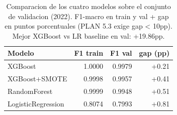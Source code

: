 \begin{table}[ht]
\centering
\small
\caption{Comparacion de los cuatro modelos sobre el conjunto de validacion (2022).
F1-macro en train y val + gap en puntos porcentuales (PLAN 5.3 exige gap < 10pp).
Mejor XGBoost vs LR baseline en val: +19.86pp.}
\label{tab:comparacion_modelos_validation}
\begin{tabular}{l rrr}
\toprule
Modelo & F1 train & F1 val & gap (pp) \\
\midrule
XGBoost & 1.0000 & 0.9979 & +0.21 \\
XGBoost+SMOTE & 0.9998 & 0.9957 & +0.41 \\
RandomForest & 0.9999 & 0.9948 & +0.51 \\
LogisticRegression & 0.8074 & 0.7993 & +0.81 \\
\bottomrule
\end{tabular}
\end{table}
